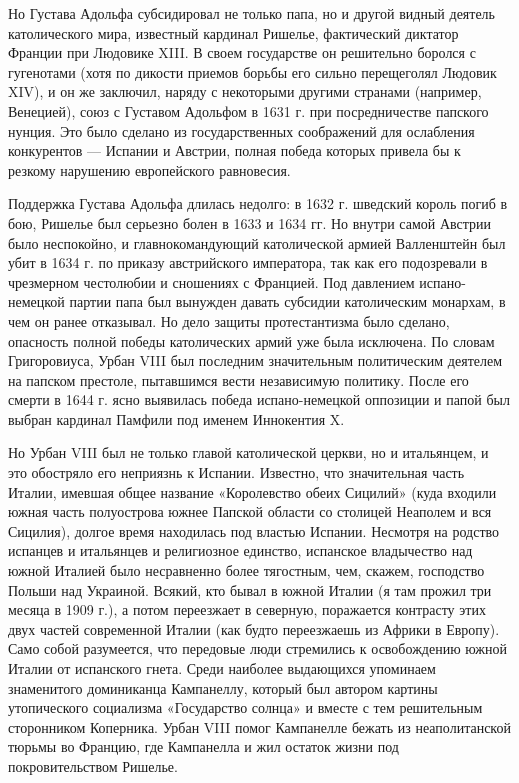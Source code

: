 Но Густава  Адольфа субсидировал  не только папа,  но и  другой видный
деятель  католического мира,  известный кардинал  Ришелье, фактический
диктатор Франции при Людовике XIII.  В своем государстве он решительно
боролся  с  гугенотами (хотя  по  дикости  приемов борьбы  его  сильно
перещеголял  Людовик  XIV), и  он  же  заключил, наряду  с  некоторыми
другими  странами (например,  Венецией),  союз с  Густавом Адольфом  в
1631  г.  при посредничестве  папского  нунция.  Это было  сделано  из
государственных  соображений для  ослабления  конкурентов ---  Испании
и  Австрии,  полная победа  которых  привела  бы к  резкому  нарушению
европейского равновесия.

Поддержка Густава Адольфа  длилась недолго: в 1632  г. шведский король
погиб в бою,  Ришелье был серьезно болен  в 1633 и 1634  гг. Но внутри
самой Австрии было неспокойно, и главнокомандующий католической армией
Валленштейн был убит в 1634 г. по приказу австрийского императора, так
как его  подозревали в чрезмерном  честолюбии и сношениях  с Францией.
Под давлением испано-немецкой партии папа был вынужден давать субсидии
католическим  монархам,  в чем  он  ранее  отказывал. Но  дело  защиты
протестантизма  было  сделано,  опасность полной  победы  католических
армий  уже была  исключена.  По словам  Григоровиуса,  Урбан VIII  был
последним  значительным  политическим  деятелем на  папском  престоле,
пытавшимся вести независимую политику. После его смерти в 1644 г. ясно
выявилась победа испано-немецкой оппозиции и папой был выбран кардинал
Памфили под именем Иннокентия X.

Но  Урбан  VIII  был  не  только  главой  католической  церкви,  но  и
итальянцем,  и  это  обостряло  его  неприязнь  к  Испании.  Известно,
что  значительная часть  Италии, имевшая  общее название  «Королевство
обеих  Сицилий» (куда  входили южная  часть полуострова  южнее Папской
области со столицей  Неаполем и вся Сицилия),  долгое время находилась
под  властью Испании.  Несмотря  на родство  испанцев  и итальянцев  и
религиозное  единство, испанское  владычество над  южной Италией  было
несравненно  более  тягостным,  чем,  скажем,  господство  Польши  над
Украиной. Всякий, кто бывал в южной  Италии (я там прожил три месяца в
1909 г.),  а потом  переезжает в  северную, поражается  контрасту этих
двух  частей  современной  Италии  (как будто  переезжаешь  из  Африки
в  Европу).  Само  собой  разумеется, что  передовые  люди  стремились
к  освобождению  южной  Италии  от испанского  гнета.  Среди  наиболее
выдающихся упоминаем  знаменитого доминиканца Кампанеллу,  который был
автором картины утопического социализма  «Государство солнца» и вместе
с тем  решительным сторонником Коперника. Урбан  VIII помог Кампанелле
бежать  из неаполитанской  тюрьмы  во Францию,  где  Кампанелла и  жил
остаток жизни под покровительством Ришелье.

